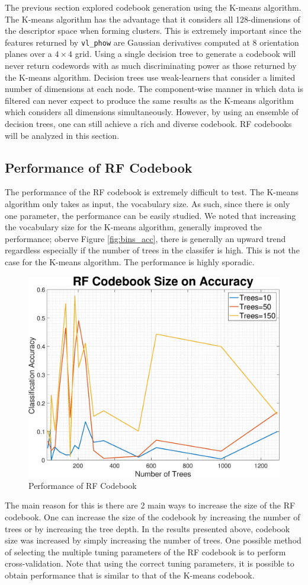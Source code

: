 \documentclass[a4paper,pra,twocolumn,10pt,aps,longbibliography,nobalancelastpage]{article}
\begin{document}
The previous section explored codebook generation using the K-means algorithm. The K-means algorithm has the advantage that it considers all 128-dimensions of the descriptor space when forming clusters. This is extremely important since the features returned by \texttt{vl\_phow} are Gaussian derivatives computed at 8 orientation planes over a $4\times 4$ grid. Using a single decision tree to generate a codebook will never return codewords with as much discriminating power as those returned by the K-means algorithm. Decision trees use weak-learners that consider a limited number of dimensions at each node. The component-wise manner in which data is filtered can never expect to produce the same results as the K-means algorithm which considers all dimensions simultaneously. However, by using an ensemble of decision trees, one can still achieve a rich and diverse codebook. RF codebooks will be analyzed in this section.

\subsection{Performance of RF Codebook}

The performance of the RF codebook is extremely difficult to test. The K-means algorithm only takes as input, the vocabulary size. As such, since there is only one parameter, the performance can be easily studied. We noted that increasing the vocabulary size for the K-means algorithm, generally improved the performance; oberve Figure \ref{fig:bins_acc}, there is generally an upward trend regardless especially if the number of trees in the classifer is high. This is not the case for the K-means algorithm. The performance is highly sporadic. 


\begin{figure}[H]
	\centering
    \includegraphics[width=0.49\columnwidth]{rf_codebook_acc}
    \caption{Performance of RF Codebook}
\end{figure}

The main reason for this is there are 2 main ways to increase the size of the RF codebook. One can increase the size of the codebook by increasing the number of trees or by increasing the tree depth. In the results presented above, codebook size was increased by simply increasing the number of trees. One possible method of selecting the multiple tuning parameters of the RF codebook is to perform cross-validation. Note that using the correct tuning parameters, it is possible to obtain performance that is similar to that of the K-means codebook. 
\end{document}
